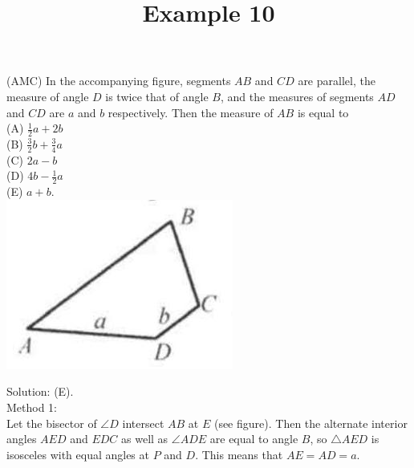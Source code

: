 \documentclass{article}
\title{Example 10}
\date{}
\begin{document}
\maketitle

(AMC) In the accompanying figure, segments \(A B\) and \(C D\) are parallel, the measure of angle \(D\) is twice that of angle \(B\), and the measures of segments \(A D\) and \(C D\) are \(a\) and \(b\) respectively. Then the measure of \(A B\) is equal to\\
(A) \(\frac{1}{2} a+2 b\)\\
(B) \(\frac{3}{2} b+\frac{3}{4} a\)\\
(C) \(2 a-b\)\\
(D) \(4 b-\frac{1}{2} a\)\\
(E) \(a+b\).\\
\centering
\includegraphics[width=\textwidth]{images/110(3).jpg}

Solution: (E).\\
Method 1:\\
Let the bisector of \(\angle D\) intersect \(A B\) at \(E\) (see figure). Then the alternate interior angles \(A E D\) and \(E D C\) as well as \(\angle A D E\) are equal to angle \(B\), so \(\triangle A E D\) is isosceles with equal angles at \(P\) and \(D\). This means that \(A E=A D=a\).
\end{document}

